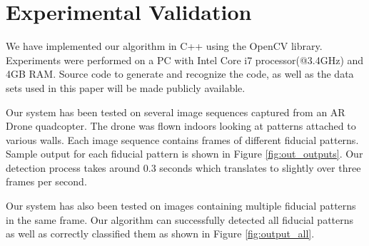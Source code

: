 \documentclass[10pt,twocolumn,letterpaper]{article}
\begin{document}

\section{Experimental Validation}

We have implemented our algorithm in C++ using the OpenCV library.
Experiments were performed on a PC with Intel Core i7 processor(@3.4GHz) and 4GB RAM.
Source code to generate and recognize the code, as well as the data sets used in
this paper will be made publicly available.  

Our system has been tested on several image sequences captured from an AR Drone
quadcopter.  The drone was flown indoors looking at patterns attached to
various walls. Each image sequence contains frames of different fiducial
patterns. Sample output for each fiducial pattern is shown in Figure
\ref{fig:out_outputs}. Our detection process takes around 0.3 seconds which
translates to slightly over three frames per second.

Our system has also been tested on images containing multiple fiducial patterns
in the same frame. Our algorithm can successfully detected all fiducial patterns as
well as correctly classified them as shown in Figure \ref{fig:output_all}.
\end{document}
